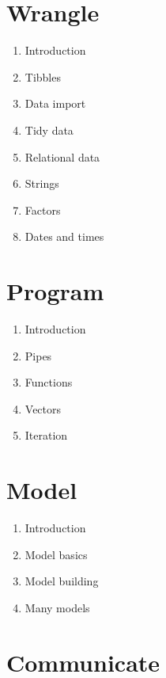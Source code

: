 \documentclass[
]{book}
\providecommand{\tightlist}{%
  \setlength{\itemsep}{0pt}\setlength{\parskip}{0pt}}
\theoremstyle{definition}
\theoremstyle{definition}
\theoremstyle{definition}
\theoremstyle{definition}
\theoremstyle{remark}
\begin{document}
\hypertarget{wrangle}{%
\section{Wrangle}\label{wrangle}}

\begin{enumerate}
\def\labelenumi{\arabic{enumi})}
\setcounter{enumi}{8}
\tightlist
\item
  Introduction
\item
  Tibbles
\item
  Data import
\item
  Tidy data
\item
  Relational data
\item
  Strings
\item
  Factors
\item
  Dates and times
\end{enumerate}

\hypertarget{program}{%
\section{Program}\label{program}}

\begin{enumerate}
\def\labelenumi{\arabic{enumi})}
\setcounter{enumi}{16}
\tightlist
\item
  Introduction
\item
  Pipes
\item
  Functions
\item
  Vectors
\item
  Iteration
\end{enumerate}

\hypertarget{model}{%
\section{Model}\label{model}}

\begin{enumerate}
\def\labelenumi{\arabic{enumi})}
\setcounter{enumi}{21}
\tightlist
\item
  Introduction
\item
  Model basics
\item
  Model building
\item
  Many models
\end{enumerate}

\hypertarget{communicate}{%
\section{Communicate}\label{communicate}}
\end{document}
